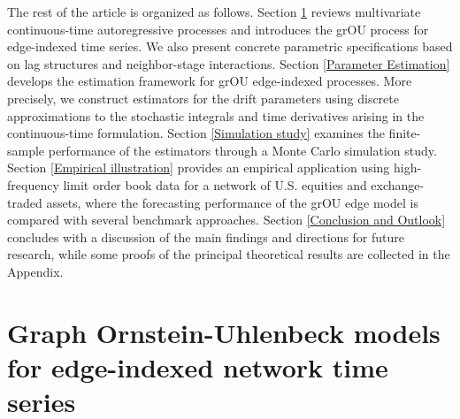 \documentclass[12pt]{amsart}
\numberwithin{equation}{section}
\newcommand{\1}{\mathbf{1}}
\begin{document}
The rest of the article is organized as follows. Section \ref{Preliminaries and Model Setup} reviews multivariate continuous-time autoregressive processes and introduces the grOU process for edge-indexed time series. We also present concrete parametric specifications based on lag structures and neighbor-stage interactions. Section \ref{Parameter Estimation} develops the estimation framework for grOU edge-indexed processes. More precisely, we construct estimators for the drift parameters using discrete approximations to the stochastic integrals and time derivatives arising in the continuous-time formulation. Section \ref{Simulation study} examines the finite-sample performance of the estimators through a Monte Carlo simulation study. Section \ref{Empirical illustration} provides an empirical application using high-frequency limit order book data for a network of U.S. equities and exchange-traded assets, where the forecasting performance of the grOU edge model is compared with several benchmark approaches. Section \ref{Conclusion and Outlook} concludes with a discussion of the main findings and directions for future research, while some proofs of the principal theoretical results are collected in the Appendix.

\section{Graph Ornstein-Uhlenbeck models for edge-indexed network time series}
\label{Preliminaries and Model Setup}
\end{document}
